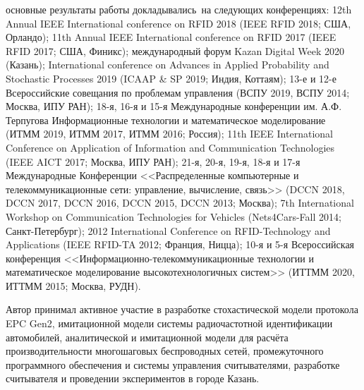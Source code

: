 {\probation}
основные результаты работы докладывались~на следующих конференциях: 12th Annual IEEE International conference on RFID 2018 (IEEE RFID 2018; США, Орландо); 11th Annual IEEE International conference on RFID 2017 (IEEE RFID 2017; США, Финикс); международный форум Kazan Digital Week 2020 (Казань); International conference on Advances in Applied Probability and Stochastic Processes 2019 (ICAAP \& SP 2019; Индия, Коттаям); 13-е и 12-е Всероссийские совещания по проблемам управления (ВСПУ 2019, ВСПУ 2014; Москва, ИПУ РАН); 18-я, 16-я и 15-я Международные конференции им. А.Ф. Терпугова Информационные технологии и математическое моделирование (ИТММ 2019, ИТММ 2017, ИТММ 2016; Россия); 11th IEEE International Conference on Application of Information and Communication Technologies (IEEE AICT 2017; Москва, ИПУ РАН); 21-я, 20-я, 19-я, 18-я и 17-я Международные Конференции <<Распределенные компьютерные и телекоммуникационные сети: управление, вычисление, связь>> (DCCN 2018, DCCN 2017, DCCN 2016, DCCN 2015, DCCN 2013; Москва); 7th International Workshop on Communication Technologies for Vehicles (Nets4Cars-Fall 2014; Санкт-Петербург); 2012 International Conference on RFID-Technology and Applications (IEEE RFID-TA 2012; Франция, Ницца); 10-я и 5-я Всероссийская конференция <<Информационно-телекоммуникационные технологии и математическое моделирование высокотехнологичных систем>> (ИТТММ 2020, ИТТММ 2015; Москва, РУДН).

{\contribution} Автор принимал активное участие в разработке стохастической модели протокола EPC Gen2, имитационной модели системы радиочастотной идентификации автомобилей, аналитической и имитационной модели для расчёта производительности многошаговых беспроводных сетей, промежуточного программного обеспечения и системы управления считывателями, разработке считывателя и проведении экспериментов в городе Казань.

